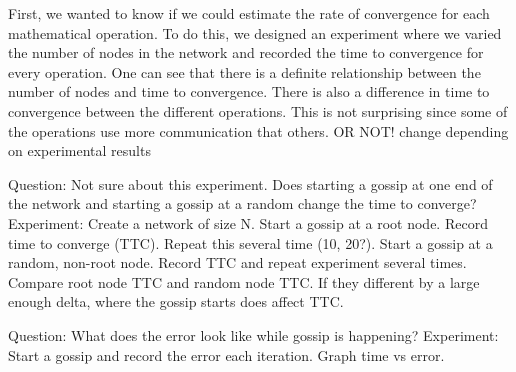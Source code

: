 First, we wanted to know if we could estimate the rate of convergence for each mathematical operation. To do this, we designed an experiment where we varied the number of nodes in the network and recorded the time to convergence for every operation. One can see that there is a definite relationship between the number of nodes and time to convergence. There is also a difference in time to convergence between the different operations. This is not surprising since some of the operations use more communication that others. OR NOT! change depending on experimental results

Question:
Not sure about this experiment.
Does starting a gossip at one end of the network and starting a gossip at a random change the time to converge?
Experiment:
Create a network of size N. Start a gossip at a root node. Record time to converge (TTC). Repeat this several time (10, 20?). Start a gossip at a random, non-root node. Record TTC and repeat experiment several times. Compare root node TTC and random node TTC. If they different by a large enough delta, where the gossip starts does affect TTC.

Question:
What does the error look like while gossip is happening?
Experiment:
Start a gossip and record the error each iteration. Graph time vs error. 
